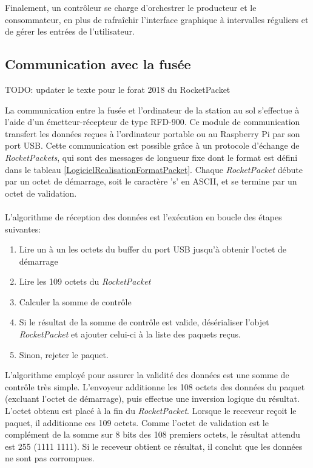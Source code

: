 Finalement, un contrôleur se charge d'orchestrer le producteur et le consommateur, en plus de rafraîchir l'interface graphique à intervalles réguliers et de gérer les entrées de l'utilisateur.

\subsection{Communication avec la fusée}
\label{s:rocket_communication}
TODO: updater le texte pour le forat 2018 du RocketPacket

La communication entre la fusée et l'ordinateur de la station au sol s'effectue à l'aide d'un émetteur-récepteur de type RFD-900.
Ce module de communication transfert les données reçues à l'ordinateur portable ou au Raspberry Pi par son port USB.
Cette communication est possible grâce à un protocole d'échange de \emph{RocketPackets}, qui sont des messages de longueur fixe dont le format est défini dans le tableau \ref{LogicielRealisationFormatPacket}.
Chaque \emph{RocketPacket} débute par un octet de démarrage, soit le caractère 's' en ASCII, et se termine par un octet de validation.
\\ \\
L'algorithme de réception des données est l'exécution en boucle des étapes suivantes:

\begin{enumerate}
    \item Lire un à un les octets du buffer du port USB jusqu'à obtenir l'octet de démarrage
    \item Lire les 109 octets du \emph{RocketPacket}
    \item Calculer la somme de contrôle
    \item Si le résultat de la somme de contrôle est valide, désérialiser l'objet \emph{RocketPacket} et ajouter celui-ci à la liste des paquets reçus.
    \item Sinon, rejeter le paquet.
\end{enumerate}

L'algorithme employé pour assurer la validité des données est une somme de contrôle très simple.
L'envoyeur additionne les 108 octets des données du paquet (excluant l'octet de démarrage), puis effectue une inversion logique du résultat.
L'octet obtenu est placé à la fin du \emph{RocketPacket}.
Lorsque le receveur reçoit le paquet, il additionne ces 109 octets.
Comme l'octet de validation est le complément de la somme sur 8 bits des 108 premiers octets, le résultat attendu est 255 (1111 1111).
Si le receveur obtient ce résultat, il conclut que les données ne sont pas corrompues.

